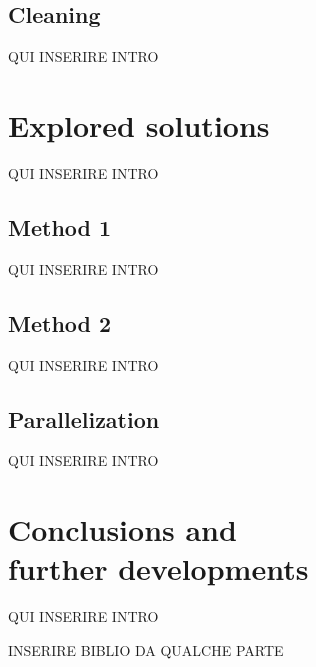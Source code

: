 \documentclass{acm_proc_article-sp-sigmod09}
\begin{document}
	\subsection{Cleaning}
	QUI INSERIRE INTRO
	
	\section{Explored solutions}
	QUI INSERIRE INTRO
	
	\subsection{Method 1}
	QUI INSERIRE INTRO
	
	\subsection{Method 2}
	QUI INSERIRE INTRO
	
	\subsection{Parallelization}
	QUI INSERIRE INTRO
	
	\section{Conclusions and \\further developments}
	QUI INSERIRE INTRO
	
	
	
	
	INSERIRE BIBLIO DA QUALCHE PARTE
\end{document}

